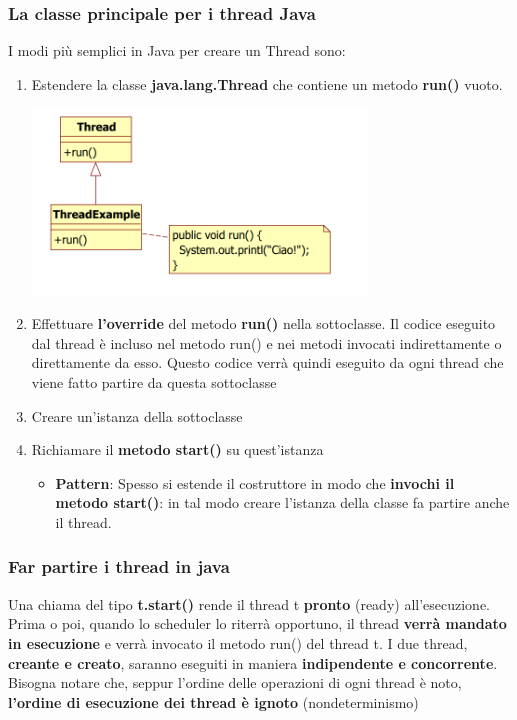 \documentclass[12pt]{article}
\begin{document}
\subsubsection{La classe principale per i thread Java}
I modi più semplici in Java per creare un Thread sono:
\begin{enumerate}
    \item Estendere la classe \textbf{java.lang.Thread} che contiene un metodo \textbf{run()} vuoto.
          \begin{center}
              \includegraphics[width = 0.70\textwidth]{Images/68.PNG}
          \end{center}
    \item Effettuare \textbf{l'override} del metodo \textbf{run()} nella sottoclasse. Il codice eseguito dal thread è incluso nel metodo run() e nei metodi invocati indirettamente o direttamente da esso. Questo codice verrà quindi eseguito da ogni thread che viene fatto partire da questa sottoclasse
    \item Creare un'istanza della sottoclasse
    \item Richiamare il \textbf{metodo start()} su quest'istanza
          \begin{itemize}
              \item \textbf{Pattern}: Spesso si estende il costruttore in modo che \textbf{invochi il metodo start()}: in tal modo creare l'istanza della classe fa partire anche il thread.
          \end{itemize}
\end{enumerate}
\subsubsection{Far partire i thread in java}
Una chiama del tipo \textbf{t.start()} rende il thread t \textbf{pronto} (ready) all'esecuzione. Prima o poi, quando lo scheduler lo riterrà opportuno, il thread \textbf{verrà mandato in esecuzione} e verrà invocato il metodo run() del thread t. I due thread, \textbf{creante e creato}, saranno eseguiti in maniera \textbf{indipendente e concorrente}. Bisogna notare che, seppur l'ordine delle operazioni di ogni thread è noto, \textbf{l'ordine di esecuzione dei thread è ignoto} (nondeterminismo)
\end{document}
